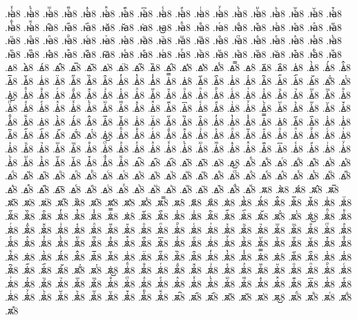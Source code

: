 {.ꙗ҆ⷹ8
.ꙗ҆ⷺ8
.ꙗ҆ⷻ8
.ꙗ҆ⷼ8
.ꙗ҆ⷽ8
.ꙗ҆ⷾ8
.ꙗ҆ⷿ8
.ꙗ҆꙯8
.ꙗ҆ꙴ8
.ꙗ҆ꙵ8
.ꙗ҆ꙶ8
.ꙗ҆ꙷ8
.ꙗ҆ꙸ8
.ꙗ҆ꙹ8
.ꙗ҆ꙺ8
.ꙗ҆ꙻ8
.ꙗ҆꙼8
.ꙗ҆꙽8
.ꙗ҆ꚞ8
.ꙗ҆ꚟ8
.ꙗ҇8
.ꙗ᷀8
.ꙗ᷁8
.ꙗ᷶8
.ꙗ᷷8
.ꙗ᷸8
.ꙗ᷹8
.ꙗⷠ8
.ꙗⷡ8
.ꙗⷢ8
.ꙗⷣ8
.ꙗⷤ8
.ꙗⷥ8
.ꙗⷦ8
.ꙗⷧ8
.ꙗⷨ8
.ꙗⷩ8
.ꙗⷪ8
.ꙗⷫ8
.ꙗⷬ8
.ꙗⷭ8
.ꙗⷮ8
.ꙗⷯ8
.ꙗⷰ8
.ꙗⷱ8
.ꙗⷲ8
.ꙗⷳ8
.ꙗⷴ8
.ꙗⷵ8
.ꙗⷶ8
.ꙗⷷ8
.ꙗⷸ8
.ꙗⷹ8
.ꙗⷺ8
.ꙗⷻ8
.ꙗⷼ8
.ꙗⷽ8
.ꙗⷾ8
.ꙗⷿ8
.ꙗ꙯8
.ꙗꙴ8
.ꙗꙵ8
.ꙗꙶ8
.ꙗꙷ8
.ꙗꙸ8
.ꙗꙹ8
.ꙗꙺ8
.ꙗꙻ8
.ꙗ꙼8
.ꙗ꙽8
.ꙗꚞ8
.ꙗꚟ8
.ꙙ8
.ꙙ̀8
.ꙙ́8
.ꙙ̂8
.ꙙ̅8
.ꙙ̆8
.ꙙ̇8
.ꙙ̈8
.ꙙ̋8
.ꙙ̏8
.ꙙ̑8
.ꙙ̓8
.ꙙ̔8
.ꙙ̾8
.ꙙ̿8
.ꙙ͘8
.ꙙ҃8
.ꙙ҄8
.ꙙ҅8
.ꙙ҅̀8
.ꙙ҅́8
.ꙙ҅̂8
.ꙙ҅̅8
.ꙙ҅̆8
.ꙙ҅̇8
.ꙙ҅̈8
.ꙙ҅̋8
.ꙙ҅̏8
.ꙙ҅̑8
.ꙙ҅̓8
.ꙙ҅̔8
.ꙙ҅̾8
.ꙙ҅̿8
.ꙙ҅͘8
.ꙙ҅҃8
.ꙙ҅҄8
.ꙙ҅҅8
.ꙙ҅҆8
.ꙙ҅҇8
.ꙙ҅᷀8
.ꙙ҅᷁8
.ꙙ҅᷶8
.ꙙ᷷҅8
.ꙙ᷸҅8
.ꙙ᷹҅8
.ꙙ҅ⷠ8
.ꙙ҅ⷡ8
.ꙙ҅ⷢ8
.ꙙ҅ⷣ8
.ꙙ҅ⷤ8
.ꙙ҅ⷥ8
.ꙙ҅ⷦ8
.ꙙ҅ⷧ8
.ꙙ҅ⷨ8
.ꙙ҅ⷩ8
.ꙙ҅ⷪ8
.ꙙ҅ⷫ8
.ꙙ҅ⷬ8
.ꙙ҅ⷭ8
.ꙙ҅ⷮ8
.ꙙ҅ⷯ8
.ꙙ҅ⷰ8
.ꙙ҅ⷱ8
.ꙙ҅ⷲ8
.ꙙ҅ⷳ8
.ꙙ҅ⷴ8
.ꙙ҅ⷵ8
.ꙙ҅ⷶ8
.ꙙ҅ⷷ8
.ꙙ҅ⷸ8
.ꙙ҅ⷹ8
.ꙙ҅ⷺ8
.ꙙ҅ⷻ8
.ꙙ҅ⷼ8
.ꙙ҅ⷽ8
.ꙙ҅ⷾ8
.ꙙ҅ⷿ8
.ꙙ҅꙯8
.ꙙ҅ꙴ8
.ꙙ҅ꙵ8
.ꙙ҅ꙶ8
.ꙙ҅ꙷ8
.ꙙ҅ꙸ8
.ꙙ҅ꙹ8
.ꙙ҅ꙺ8
.ꙙ҅ꙻ8
.ꙙ҅꙼8
.ꙙ҅꙽8
.ꙙ҅ꚞ8
.ꙙ҅ꚟ8
.ꙙ҆8
.ꙙ҆̀8
.ꙙ҆́8
.ꙙ҆̂8
.ꙙ҆̅8
.ꙙ҆̆8
.ꙙ҆̇8
.ꙙ҆̈8
.ꙙ҆̋8
.ꙙ҆̏8
.ꙙ҆̑8
.ꙙ҆̓8
.ꙙ҆̔8
.ꙙ҆̾8
.ꙙ҆̿8
.ꙙ҆͘8
.ꙙ҆҃8
.ꙙ҆҄8
.ꙙ҆҅8
.ꙙ҆҆8
.ꙙ҆҇8
.ꙙ҆᷀8
.ꙙ҆᷁8
.ꙙ҆᷶8
.ꙙ᷷҆8
.ꙙ᷸҆8
.ꙙ᷹҆8
.ꙙ҆ⷠ8
.ꙙ҆ⷡ8
.ꙙ҆ⷢ8
.ꙙ҆ⷣ8
.ꙙ҆ⷤ8
.ꙙ҆ⷥ8
.ꙙ҆ⷦ8
.ꙙ҆ⷧ8
.ꙙ҆ⷨ8
.ꙙ҆ⷩ8
.ꙙ҆ⷪ8
.ꙙ҆ⷫ8
.ꙙ҆ⷬ8
.ꙙ҆ⷭ8
.ꙙ҆ⷮ8
.ꙙ҆ⷯ8
.ꙙ҆ⷰ8
.ꙙ҆ⷱ8
.ꙙ҆ⷲ8
.ꙙ҆ⷳ8
.ꙙ҆ⷴ8
.ꙙ҆ⷵ8
.ꙙ҆ⷶ8
.ꙙ҆ⷷ8
.ꙙ҆ⷸ8
.ꙙ҆ⷹ8
.ꙙ҆ⷺ8
.ꙙ҆ⷻ8
.ꙙ҆ⷼ8
.ꙙ҆ⷽ8
.ꙙ҆ⷾ8
.ꙙ҆ⷿ8
.ꙙ҆꙯8
.ꙙ҆ꙴ8
.ꙙ҆ꙵ8
.ꙙ҆ꙶ8
.ꙙ҆ꙷ8
.ꙙ҆ꙸ8
.ꙙ҆ꙹ8
.ꙙ҆ꙺ8
.ꙙ҆ꙻ8
.ꙙ҆꙼8
.ꙙ҆꙽8
.ꙙ҆ꚞ8
.ꙙ҆ꚟ8
.ꙙ҇8
.ꙙ᷀8
.ꙙ᷁8
.ꙙ᷶8
.ꙙ᷷8
.ꙙ᷸8
.ꙙ᷹8
.ꙙⷠ8
.ꙙⷡ8
.ꙙⷢ8
.ꙙⷣ8
.ꙙⷤ8
.ꙙⷥ8
.ꙙⷦ8
.ꙙⷧ8
.ꙙⷨ8
.ꙙⷩ8
.ꙙⷪ8
.ꙙⷫ8
.ꙙⷬ8
.ꙙⷭ8
.ꙙⷮ8
.ꙙⷯ8
.ꙙⷰ8
.ꙙⷱ8
.ꙙⷲ8
.ꙙⷳ8
.ꙙⷴ8
.ꙙⷵ8
.ꙙⷶ8
.ꙙⷷ8
.ꙙⷸ8
.ꙙⷹ8
.ꙙⷺ8
.ꙙⷻ8
.ꙙⷼ8
.ꙙⷽ8
.ꙙⷾ8
.ꙙⷿ8
.ꙙ꙯8
.ꙙꙴ8
.ꙙꙵ8
.ꙙꙶ8
.ꙙꙷ8
.ꙙꙸ8
.ꙙꙹ8
.ꙙꙺ8
.ꙙꙻ8
.ꙙ꙼8
.ꙙ꙽8
.ꙙꚞ8
.ꙙꚟ8
.ꙛ8
.ꙛ̀8
.ꙛ́8
.ꙛ̂8
.ꙛ̅8
.ꙛ̆8
.ꙛ̇8
.ꙛ̈8
.ꙛ̋8
.ꙛ̏8
.ꙛ̑8
.ꙛ̓8
.ꙛ̔8
.ꙛ̾8
.ꙛ̿8
.ꙛ͘8
.ꙛ҃8
.ꙛ҄8
.ꙛ҅8
.ꙛ҅̀8
.ꙛ҅́8
.ꙛ҅̂8
.ꙛ҅̅8
.ꙛ҅̆8
.ꙛ҅̇8
.ꙛ҅̈8
.ꙛ҅̋8
.ꙛ҅̏8
.ꙛ҅̑8
.ꙛ҅̓8
.ꙛ҅̔8
.ꙛ҅̾8
.ꙛ҅̿8
.ꙛ҅͘8
.ꙛ҅҃8
.ꙛ҅҄8
.ꙛ҅҅8
.ꙛ҅҆8
.ꙛ҅҇8
.ꙛ҅᷀8
.ꙛ҅᷁8
.ꙛ҅᷶8
.ꙛ᷷҅8
.ꙛ᷸҅8
.ꙛ᷹҅8
.ꙛ҅ⷠ8
.ꙛ҅ⷡ8
.ꙛ҅ⷢ8
.ꙛ҅ⷣ8
.ꙛ҅ⷤ8
.ꙛ҅ⷥ8
.ꙛ҅ⷦ8
.ꙛ҅ⷧ8
.ꙛ҅ⷨ8
.ꙛ҅ⷩ8
.ꙛ҅ⷪ8
.ꙛ҅ⷫ8
.ꙛ҅ⷬ8
.ꙛ҅ⷭ8
.ꙛ҅ⷮ8
.ꙛ҅ⷯ8
.ꙛ҅ⷰ8
.ꙛ҅ⷱ8
.ꙛ҅ⷲ8
.ꙛ҅ⷳ8
.ꙛ҅ⷴ8
.ꙛ҅ⷵ8
.ꙛ҅ⷶ8
.ꙛ҅ⷷ8
.ꙛ҅ⷸ8
.ꙛ҅ⷹ8
.ꙛ҅ⷺ8
.ꙛ҅ⷻ8
.ꙛ҅ⷼ8
.ꙛ҅ⷽ8
.ꙛ҅ⷾ8
.ꙛ҅ⷿ8
.ꙛ҅꙯8
.ꙛ҅ꙴ8
.ꙛ҅ꙵ8
.ꙛ҅ꙶ8
.ꙛ҅ꙷ8
.ꙛ҅ꙸ8
.ꙛ҅ꙹ8
.ꙛ҅ꙺ8
.ꙛ҅ꙻ8
.ꙛ҅꙼8
.ꙛ҅꙽8
.ꙛ҅ꚞ8
.ꙛ҅ꚟ8
.ꙛ҆8
.ꙛ҆̀8
.ꙛ҆́8
.ꙛ҆̂8
.ꙛ҆̅8
.ꙛ҆̆8
.ꙛ҆̇8
.ꙛ҆̈8
.ꙛ҆̋8
.ꙛ҆̏8
.ꙛ҆̑8
.ꙛ҆̓8
.ꙛ҆̔8
.ꙛ҆̾8
.ꙛ҆̿8
.ꙛ҆͘8
.ꙛ҆҃8
.ꙛ҆҄8
.ꙛ҆҅8
.ꙛ҆҆8
.ꙛ҆҇8
.ꙛ҆᷀8
.ꙛ҆᷁8
.ꙛ҆᷶8
.ꙛ᷷҆8
.ꙛ᷸҆8
.ꙛ᷹҆8
.ꙛ҆ⷠ8
.ꙛ҆ⷡ8
.ꙛ҆ⷢ8
.ꙛ҆ⷣ8
.ꙛ҆ⷤ8
.ꙛ҆ⷥ8
.ꙛ҆ⷦ8
.ꙛ҆ⷧ8
.ꙛ҆ⷨ8
.ꙛ҆ⷩ8
.ꙛ҆ⷪ8
.ꙛ҆ⷫ8
.ꙛ҆ⷬ8
.ꙛ҆ⷭ8
.ꙛ҆ⷮ8
.ꙛ҆ⷯ8
.ꙛ҆ⷰ8
.ꙛ҆ⷱ8
.ꙛ҆ⷲ8
.ꙛ҆ⷳ8
.ꙛ҆ⷴ8
.ꙛ҆ⷵ8
.ꙛ҆ⷶ8
.ꙛ҆ⷷ8
.ꙛ҆ⷸ8
.ꙛ҆ⷹ8
.ꙛ҆ⷺ8
.ꙛ҆ⷻ8
.ꙛ҆ⷼ8
.ꙛ҆ⷽ8
.ꙛ҆ⷾ8
.ꙛ҆ⷿ8
.ꙛ҆꙯8
.ꙛ҆ꙴ8
.ꙛ҆ꙵ8
.ꙛ҆ꙶ8
.ꙛ҆ꙷ8
.ꙛ҆ꙸ8
.ꙛ҆ꙹ8
.ꙛ҆ꙺ8
.ꙛ҆ꙻ8
.ꙛ҆꙼8
.ꙛ҆꙽8
.ꙛ҆ꚞ8
.ꙛ҆ꚟ8
.ꙛ҇8
.ꙛ᷀8
.ꙛ᷁8
.ꙛ᷶8
.ꙛ᷷8
.ꙛ᷸8
.ꙛ᷹8
.ꙛⷠ8
.ꙛⷡ8
.ꙛⷢ8
.ꙛⷣ8
.ꙛⷤ8
}
